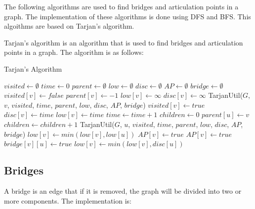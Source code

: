 The following algorithms are used to find bridges and articulation points in a graph. The implementation of these algorithms is done using DFS and BFS. This algoithms are based on Tarjan's algorithm.

Tarjan's algorithm is an algorithm that is used to find bridges and articulation points in a graph. The algorithm is as follows:

\begin{algorithm}
\caption{Tarjan's Algorithm}
\label{alg:tarjan}
\begin{algorithmic}[1]
\State $visited \gets \emptyset$
\State $time \gets 0$
\State $parent \gets \emptyset$
\State $low \gets \emptyset$
\State $disc \gets \emptyset$
\State $AP \gets \emptyset$
\State $bridge \gets \emptyset$
\State $visited[v] \gets false$
\State $parent[v] \gets -1$
\State $low[v] \gets \infty$
\State $disc[v] \gets \infty$
\EndFor
{}
\State TarjanUtil($G$, $v$, $visited$, $time$, $parent$, $low$, $disc$, $AP$, $bridge$)
\EndIf
\EndFor
\EndProcedure
{}
\State $visited[v] \gets true$
\State $disc[v] \gets time$
\State $low[v] \gets time$
\State $time \gets time + 1$
\State $children \gets 0$
\State $parent[u] \gets v$
\State $children \gets children + 1$
\State TarjanUtil($G$, $u$, $visited$, $time$, $parent$, $low$, $disc$, $AP$, $bridge$)
\State $low[v] \gets min(low[v], low[u])$
\State $AP[v] \gets true$
\EndIf
{}
\State $AP[v] \gets true$
\EndIf
{}
\State $bridge[v][u] \gets true$
\EndIf
\Else
\State $low[v] \gets min(low[v], disc[u])$
\EndIf
\EndFor
\EndProcedure
\end{algorithmic}
\end{algorithm}



\subsection{Bridges}

A bridge is an edge that if it is removed, the graph will be divided into two or more components. The implementation is:




